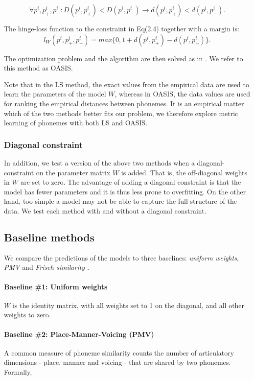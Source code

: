 \begin{equation}
\forall{p^i, p^i_+, p^i_-}: D(p^i, p^i_+)<D(p^i, p^i_-) \rightarrow d(p^i, p^i_+)<d(p^i, p^i_-).
\end{equation}

The hinge-loss function to the constraint in Eq(2.4) together with a margin is:
\begin{equation}
    l_W(p^i, p^i_+, p^i_-) = max\{0, 1 + d(p^i, p^i_+) - d(p^i, p^i_-)\}.
\end{equation}

The optimization problem and the algorithm are then solved as in \citet{Chechik2010}. We refer to this method as OASIS.

Note that in the LS method, the exact values from the empirical data are used to learn the parameters of the model $W$, whereas in OASIS, the data values are used for ranking the empirical distances between phonemes. It is an empirical matter which of the two methods better fits our problem, we therefore explore metric learning of phonemes with both LS and OASIS.

\subsubsection{Diagonal constraint} In addition, we test a version of the above two methods when a diagonal-constraint on the parameter matrix $W$ is added. That is, the off-diagonal weights in $W$ are set to zero. The advantage of adding a diagonal constraint is that the model has fewer parameters and it is thus less prone to overfitting. On the other hand, too simple a model may not be able to capture the full structure of the data. We test each method with and without a diagonal constraint. 

\subsection{Baseline methods}
We compare the predictions of the models to three baselines: \textit{uniform weights}, \textit{PMV} \citep{ladefoged2014course} and \textit{Frisch similarity \citep{Frisch1997}}.

\paragraph{Baseline \#1: Uniform weights} $W$ is the identity matrix, with all weights set to 1 on the diagonal, and all other weights to zero.

\paragraph{Baseline \#2: Place-Manner-Voicing (PMV)} A common measure of phoneme similarity counts the number of articulatory dimensions - place, manner and voicing - that are shared by two phonemes. Formally,

